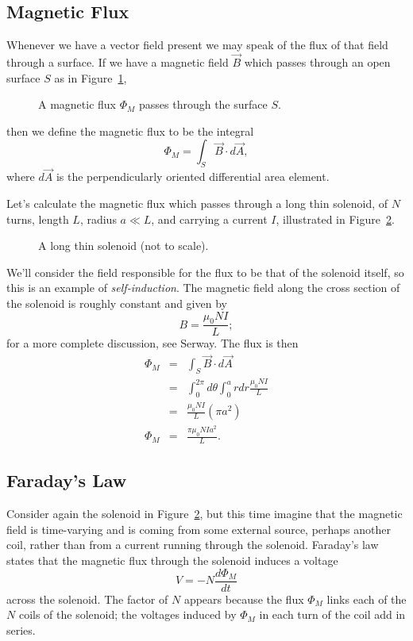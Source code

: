 \subsection{Magnetic Flux}

Whenever we have a vector field present we may speak of the flux of that field 
through a surface.  If we have a magnetic field $\vec{B}$ which passes through 
an open surface $S$ as in Figure~\ref{fig:ind:fluxdef},
\begin{figure}[htb]
\centerline{\epsfxsize=7cm }
\caption{A magnetic flux $\Phi_M$ passes through the surface $S$.}
\label{fig:ind:fluxdef}
\end{figure}
then we define the magnetic flux to be the integral
$$
\Phi_M=\int_S \vec{B}\cdot d\vec{A},
$$
where $d\vec{A}$ is the perpendicularly oriented differential area element.

Let's calculate the magnetic flux which passes through a long thin solenoid, 
of $N$ turns, length $L$, radius $a\ll L$, and carrying a current $I$, 
illustrated in Figure~\ref{fig:ind:solenoid}. 
\begin{figure}[htb]
\centerline{\epsfxsize=9cm }
\caption{A long thin solenoid (not to scale).}
\label{fig:ind:solenoid}
\end{figure}
We'll consider the field responsible for the flux to be that of the solenoid 
itself, so this is an example of {\it self-induction}. The magnetic field 
along the cross section of the solenoid is roughly constant and given by
$$ B= \frac{\mu_0 N I}{L}; $$
for a more complete discussion, see Serway. The flux is then
\begin{eqnarray}
\Phi_M &=& \int_S \vec{B}\cdot d\vec{A} \nonumber \\
&=& \int_0^{2\pi} d\theta \int_0^a r dr \frac{\mu_0 NI}{L} \nonumber \\
&=& \frac{\mu_0 NI}{L} (\pi a^2) \nonumber \\
\Phi_M &=& \frac{\pi\mu_0N Ia^2}{L}.
\end{eqnarray}

\subsection{Faraday's Law}

Consider again the solenoid in Figure~\ref{fig:ind:solenoid}, but this time 
imagine that the magnetic field is time-varying and is coming from some
external source, perhaps another coil, rather than from a current running 
through the solenoid.  Faraday's law states that the magnetic flux through the 
solenoid induces a voltage
\begin{equation}
V=-N\frac{d\Phi_M}{dt} \label{eq:ind:faraday}
\end{equation}
across the solenoid.  The factor of $N$ appears because the flux $\Phi_M$ links
each of the $N$ coils of the solenoid; the voltages induced by $\Phi_M$ in 
each turn of the coil add in series. 


